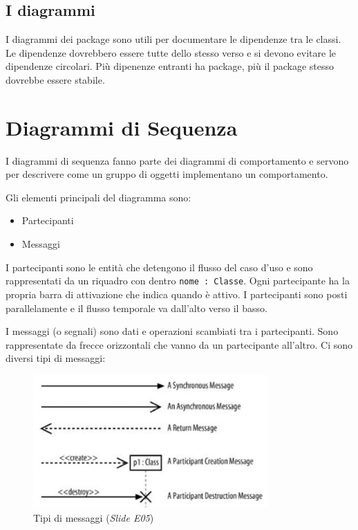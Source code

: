 \subsection{I diagrammi}

I diagrammi dei package sono utili per documentare le dipendenze tra le classi. 
Le dipendenze dovrebbero essere tutte dello stesso verso e si devono evitare le dipendenze circolari. 
Più dipenenze entranti ha package, più il package stesso dovrebbe essere stabile.

\section{Diagrammi di Sequenza}
I diagrammi di sequenza fanno parte dei diagrammi di comportamento e servono per descrivere come un gruppo di oggetti implementano un comportamento.

Gli elementi principali del diagramma sono:
\begin{itemize}
\item Partecipanti
\item Messaggi
\end{itemize}

I partecipanti sono le entità che detengono il flusso del caso d'uso e sono rappresentati da un riquadro con dentro \texttt{nome : Classe}.
Ogni partecipante ha la propria barra di attivazione che indica quando è attivo.
I partecipanti sono posti parallelamente e il flusso temporale va dall'alto verso il basso.

I messaggi (o segnali) sono dati e operazioni scambiati tra i partecipanti. 
Sono rappresentate da frecce orizzontali che vanno da un partecipante all'altro. Ci sono diversi tipi di messaggi:

\begin{figure}[H]
\centering
    \includegraphics[width=0.8\textwidth]{res/img/messaggiDiagrammiSequenza}
    \caption{Tipi di messaggi (\textit{Slide E05})}
\end{figure}

